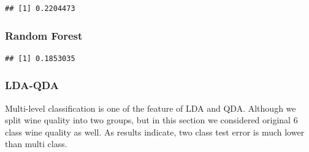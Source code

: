 \documentclass[../main.tex]{subfiles}
\begin{document}
\begin{verbatim}
## [1] 0.2204473
\end{verbatim}

\subsubsection{Random Forest}
\begin{Shaded}
\begin{Highlighting}[]
\NormalTok{(}\NormalTok{, }\NormalTok{, }\NormalTok{)}
\NormalTok{(}\NormalTok{(}\OperatorTok{:}\NormalTok{))}

\OperatorTok{~}\NormalTok{, }\NormalTok{,}

\OperatorTok{\$}

\StringTok{ }
\OperatorTok{!=}\StringTok{ }\OperatorTok{\$}
\end{Highlighting}
\end{Shaded}

\begin{verbatim}
## [1] 0.1853035
\end{verbatim}



\subsubsection{LDA-QDA}

\noindent Multi-level classification is one of the feature of LDA and QDA. Although we split wine quality into two groups, but in this section we considered original 6 class wine quality as well. As results indicate, two class test error is much lower than multi class.
\end{document}
